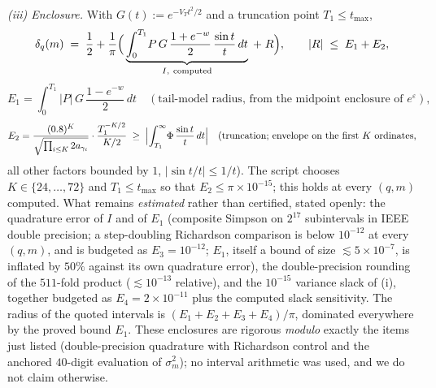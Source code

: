 \documentclass[11pt]{article}
\newcommand{\eps}{\varepsilon}
\begin{document}
\emph{(iii) Enclosure.} With $G(t):=e^{-V_Tt^2/2}$ and a truncation
point $T_1\le t_{\max}$,
\[
\delta_q(m)\;=\;\frac12+\frac1\pi\Bigl(\,
\underbrace{\int_0^{T_1}\!P\,G\,\frac{1+e^{-w}}2\,\frac{\sin t}{t}\,dt}_{I,\ \text{computed}}
\;+\;R\Bigr),
\qquad |R|\;\le\;E_1+E_2,
\]
\[
E_1=\int_0^{T_1}\!|P|\,G\,\frac{1-e^{-w}}2\,dt
\quad(\text{tail-model radius, from the midpoint enclosure of }e^{\eps}),
\]
\[
E_2=\frac{(0.8)^K}{\sqrt{\prod_{i\le K}2a_{\gamma_i}}}\cdot
\frac{T_1^{-K/2}}{K/2}
\;\ge\;\Bigl|\int_{T_1}^\infty\!\Phi\,\frac{\sin t}{t}\,dt\Bigr|
\quad(\text{truncation; envelope on the first }K\text{ ordinates,}
\]
all other factors bounded by $1$, $|\sin t/t|\le1/t$). The script
chooses $K\in\{24,\dots,72\}$ and $T_1\le t_{\max}$ so that
$E_2\le\pi\times10^{-15}$; this holds at every $(q,m)$ computed.
What remains \emph{estimated} rather than certified, stated openly:
the quadrature error of $I$ and of $E_1$ (composite Simpson on $2^{17}$
subintervals in IEEE double precision; a step-doubling Richardson
comparison is below $10^{-12}$ at every $(q,m)$, and is budgeted as
$E_3=10^{-12}$; $E_1$, itself a bound of size $\lesssim5\times10^{-7}$,
is inflated by $50\%$ against its own quadrature error), the
double-precision rounding of the $511$-fold product ($\lesssim10^{-13}$
relative), and the $10^{-15}$ variance slack of (i), together budgeted
as $E_4=2\times10^{-11}$ plus the computed slack sensitivity. The
radius of the quoted intervals is $(E_1+E_2+E_3+E_4)/\pi$, dominated
everywhere by the proved bound $E_1$. These enclosures are rigorous
\emph{modulo} exactly the items just listed (double-precision
quadrature with Richardson control and the anchored $40$-digit
evaluation of $\sigma_m^2$); no interval arithmetic was used, and we do
not claim otherwise.
\end{document}
